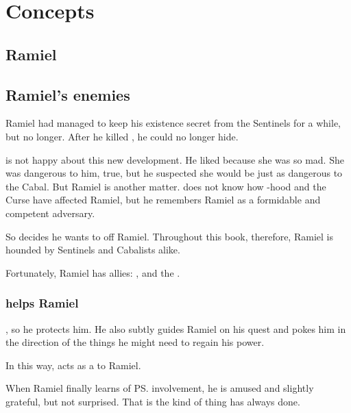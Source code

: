\section{Concepts}









\subsection{Ramiel}





\subsection{Ramiel's enemies}
Ramiel had managed to keep his existence secret from the Sentinels for a while, but no longer. 
After he killed \Shiaraid, he could no longer hide. 

\Secherdamon{} is not happy about this new development. 
He liked \Shiaraid{} because she was so mad. 
She was dangerous to him, true, but he suspected she would be just as dangerous to the Cabal. 
But Ramiel is another matter. 
\Secherdamon{} does not know how \malach-hood and the Curse have affected Ramiel, but he remembers Ramiel as a formidable and competent adversary. 

So \Secherdamon{} decides he wants to off Ramiel. 
Throughout this book, therefore, Ramiel is hounded by Sentinels and Cabalists alike. 

Fortunately, Ramiel has allies: 
\Cishiel, \Azraid{} and the \vorcanths. 





\subsubsection{\Azraid{} helps Ramiel}
\Azraid{} , so he protects him. 
He also subtly guides Ramiel on his quest and pokes him in the direction of the things he might need to regain his power. 

In this way, \Azraid{} acts as a  to Ramiel. 

When Ramiel finally learns of \ps{\Azraid} involvement, he is amused and slightly grateful, but not surprised. 
That is the kind of thing \Azraid{} has always done. 

